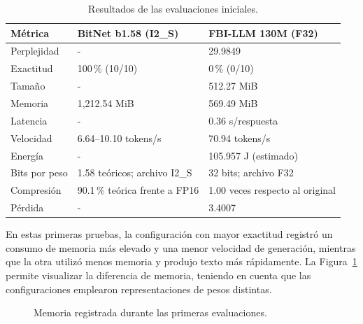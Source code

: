\begin{table}[H]
\centering
\footnotesize
\renewcommand{\arraystretch}{1.10}
\caption{Resultados de las evaluaciones iniciales.}
\label{tab:resultados_62}
\begin{tabular}{L{2.60cm}L{5.65cm}L{5.10cm}}
\toprule
Métrica & BitNet b1.58 (I2\_S) & FBI-LLM 130M (F32) \\
\midrule
Perplejidad & - & 29.9849 \\
Exactitud & 100\,\% (10/10) & 0\,\% (0/10) \\
Tamaño & - & 512.27 MiB \\
Memoria & 1,212.54 MiB & 569.49 MiB \\
Latencia & - & 0.36 s/respuesta \\
Velocidad & 6.64--10.10 tokens/s & 70.94 tokens/s \\
Energía & - & 105.957 J (estimado) \\
Bits por peso & 1.58 teóricos; archivo I2\_S & 32 bits; archivo F32 \\
Compresión & 90.1\,\% teórica frente a FP16 & 1.00 veces respecto al original \\
Pérdida & - & 3.4007 \\
\bottomrule
\end{tabular}
\end{table}

En estas primeras pruebas, la configuración con mayor exactitud registró un consumo de memoria más elevado y una menor velocidad de generación, mientras que la otra utilizó menos memoria y produjo texto más rápidamente. La Figura~\ref{fig:memoria_62} permite visualizar la diferencia de memoria, teniendo en cuenta que las configuraciones emplearon representaciones de pesos distintas.

\begin{figure}[H]
\centering
{}
\caption{Memoria registrada durante las primeras evaluaciones.}
\label{fig:memoria_62}
\end{figure}

